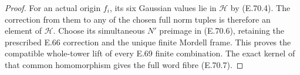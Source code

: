 \begin{proof}
For an actual origin $f_i$, its six Gaussian values
lie in $\mathscr H$ by (E.70.4). The correction from
them to any of the chosen full norm tuples is
therefore an element of $\mathscr H$. Choose its
simultaneous $N'$ preimage in (E.70.6), retaining
the prescribed E.66 correction and the unique
finite Mordell frame. This proves the compatible
whole-tower lift of every E.69 finite combination.
The exact kernel of that common homomorphism gives
the full word fibre (E.70.7).
\end{proof}
